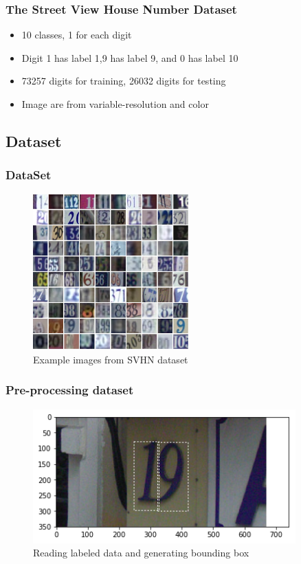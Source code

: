 \documentclass[11.5pt,aspectratio=1610,xcolor={usenames,dvipsnames,table}]{beamer}
\begin{document}
\begin{frame}

\frametitle{The Street View House Number Dataset \cite{SVHN}}

\begin{itemize}
	\item 10 classes, 1 for each digit
	\item Digit 1 has label 1,9 has label 9, and 0 has label 10
	\item 73257 digits for training, 26032 digits for testing
	\item Image are from variable-resolution and color 
\end{itemize}

\end{frame}


\begin{frame}
\section{Dataset}
\frametitle{DataSet}

\begin{figure}[!h]
	\includegraphics[height = 6cm]{images/dataset.png}
	\caption{Example images from SVHN dataset \cite{SVHN}}
\end{figure}

\end{frame}

\begin{frame}

\frametitle{Pre-processing dataset}

\begin{figure}[!h]
\includegraphics[width=0.9\textwidth]{images/19.png}
\caption{Reading labeled data and generating bounding box}

\end{figure}
\end{frame}
\end{document}

